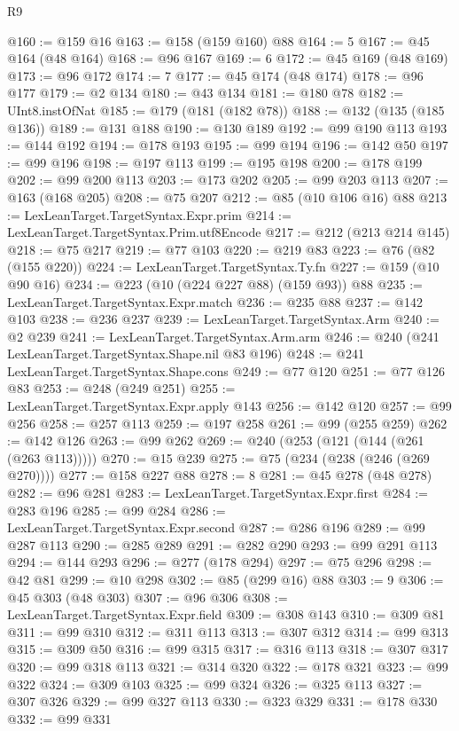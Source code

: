 \begin{lexlean}{R9}
\begin{coremodule}
{{{{{{{{{{{{{{{{{{{{{{{{{{{{{{{{{{{{{{{{{{{{{{{{{{{{{{{{{{{{{{{{{{{{{{{{{{{{{{{{{{{{@160 := @159 @16
@163 := @158 (@159 @160) @88
@164 := 5
@167 := @45 @164 (@48 @164)
@168 := @96 @167
@169 := 6
@172 := @45 @169 (@48 @169)
@173 := @96 @172
@174 := 7
@177 := @45 @174 (@48 @174)
@178 := @96 @177
@179 := @2 @134
@180 := @43 @134
@181 := @180 @78
@182 := UInt8.instOfNat
@185 := @179 (@181 (@182 @78))
@188 := @132 (@135 (@185 @136))
@189 := @131 @188
@190 := @130 @189
@192 := @99 @190 @113
@193 := @144 @192
@194 := @178 @193
@195 := @99 @194
@196 := @142 @50
@197 := @99 @196
@198 := @197 @113
@199 := @195 @198
@200 := @178 @199
@202 := @99 @200 @113
@203 := @173 @202
@205 := @99 @203 @113
@207 := @163 (@168 @205)
@208 := @75 @207
@212 := @85 (@10 @106 @16) @88
@213 := LexLeanTarget.TargetSyntax.Expr.prim
@214 := LexLeanTarget.TargetSyntax.Prim.utf8Encode
@217 := @212 (@213 @214 @145)
@218 := @75 @217
@219 := @77 @103
@220 := @219 @83
@223 := @76 (@82 (@155 @220))
@224 := LexLeanTarget.TargetSyntax.Ty.fn
@227 := @159 (@10 @90 @16)
@234 := @223 (@10 (@224 @227 @88) (@159 @93)) @88
@235 := LexLeanTarget.TargetSyntax.Expr.match
@236 := @235 @88
@237 := @142 @103
@238 := @236 @237
@239 := LexLeanTarget.TargetSyntax.Arm
@240 := @2 @239
@241 := LexLeanTarget.TargetSyntax.Arm.arm
@246 := @240 (@241 LexLeanTarget.TargetSyntax.Shape.nil @83 @196)
@248 := @241 LexLeanTarget.TargetSyntax.Shape.cons
@249 := @77 @120
@251 := @77 @126 @83
@253 := @248 (@249 @251)
@255 := LexLeanTarget.TargetSyntax.Expr.apply @143
@256 := @142 @120
@257 := @99 @256
@258 := @257 @113
@259 := @197 @258
@261 := @99 (@255 @259)
@262 := @142 @126
@263 := @99 @262
@269 := @240 (@253 (@121 (@144 (@261 (@263 @113)))))
@270 := @15 @239
@275 := @75 (@234 (@238 (@246 (@269 @270))))
@277 := @158 @227 @88
@278 := 8
@281 := @45 @278 (@48 @278)
@282 := @96 @281
@283 := LexLeanTarget.TargetSyntax.Expr.first
@284 := @283 @196
@285 := @99 @284
@286 := LexLeanTarget.TargetSyntax.Expr.second
@287 := @286 @196
@289 := @99 @287 @113
@290 := @285 @289
@291 := @282 @290
@293 := @99 @291 @113
@294 := @144 @293
@296 := @277 (@178 @294)
@297 := @75 @296
@298 := @42 @81
@299 := @10 @298
@302 := @85 (@299 @16) @88
@303 := 9
@306 := @45 @303 (@48 @303)
@307 := @96 @306
@308 := LexLeanTarget.TargetSyntax.Expr.field
@309 := @308 @143
@310 := @309 @81
@311 := @99 @310
@312 := @311 @113
@313 := @307 @312
@314 := @99 @313
@315 := @309 @50
@316 := @99 @315
@317 := @316 @113
@318 := @307 @317
@320 := @99 @318 @113
@321 := @314 @320
@322 := @178 @321
@323 := @99 @322
@324 := @309 @103
@325 := @99 @324
@326 := @325 @113
@327 := @307 @326
@329 := @99 @327 @113
@330 := @323 @329
@331 := @178 @330
@332 := @99 @331
}}}}}}}}}}}}}}}}}}}}}}}}}}}}}}}}}}}}}}}}}}}}}}}}}}}}}}}}}}}}}}}}}}}}}}}}}}}}}}}}}}}}
\end{coremodule}
\end{lexlean}
